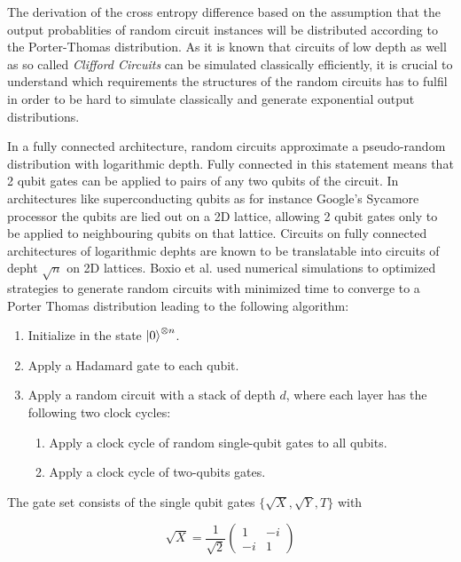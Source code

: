 The derivation of the cross entropy difference based on the assumption that the
output probablities of random circuit instances will be distributed according to
the Porter-Thomas distribution. As it is known that circuits of low depth as
well as so called \textit{Clifford Circuits} can be simulated classically
efficiently, it is crucial to understand which requirements the structures of
the random circuits has to fulfil in order to be hard to simulate classically and generate
exponential output distributions.

In a fully connected architecture, random circuits approximate a pseudo-random
distribution with logarithmic depth. Fully connected in this statement means
that 2 qubit gates can be applied to pairs of any two qubits of the circuit. In
architectures like superconducting qubits as for instance Google's Sycamore
processor the qubits are lied out on a 2D lattice, allowing 2 qubit gates only
to be applied to neighbouring qubits on that lattice. Circuits on fully
connected architectures of logarithmic dephts are known to be translatable into
circuits of depht $\sqrt{n}$ on 2D lattices. Boxio et al. used numerical
simulations to optimized strategies to generate random circuits with minimized
time to converge to a Porter Thomas distribution leading to the following algorithm:

\begin{enumerate}
  \item Initialize in the state $\Ket{0}^{\otimes n}$.
  \item Apply a Hadamard gate to each qubit.
  \item Apply a random circuit with a stack of depth $d$, where each layer has
    the following two clock cycles:
    \begin{enumerate}
      \item Apply a clock cycle of random single-qubit gates to all qubits.
        \item Apply a clock cycle of two-qubits gates.
    \end{enumerate}
\end{enumerate}

The gate set consists of the single qubit gates $\{\sqrt{X}, \sqrt{Y}, T\}$ with

\begin{equation}
  \sqrt{X} = \frac{1}{\sqrt{2}} \begin{pmatrix}
    1 & - i \\
    - i & 1
    \end{pmatrix}
\end{equation}

